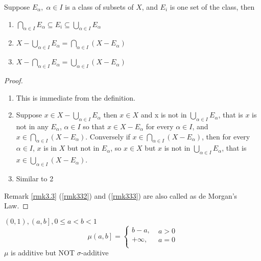 \begin{remark}
	Suppose ${E_\alpha },\;\alpha  \in I$ is a class of subsets of $ X $, and $ E_{i} $ is one set of the class, then
	\begin{enumerate}
		\item $\bigcap\limits_{\alpha  \in I} {{E_\alpha } \subseteq {E_i}}  \subseteq \bigcup\limits_{\alpha  \in I} {{E_\alpha }} $
		\item \label{rmk332}$ X - \bigcup\limits_{\alpha  \in I} {{E_\alpha }}  = \bigcap\limits_{\alpha  \in I} {\left( {X - {E_\alpha }} \right)} $
		\item \label{rmk333}$ X - \bigcap\limits_{\alpha  \in I} {{E_\alpha }}  = \bigcup\limits_{\alpha  \in I} {\left( {X - {E_\alpha }} \right)} $
	\end{enumerate}
	\label{rmk3.3}
\end{remark}

\begin{proof}
	\text{}
	\begin{enumerate}
		\item This is immediate from the definition.
		\item Suppose $ x \in  X - \bigcup\limits_{\alpha  \in I} {{E_\alpha }} $ then $ x \in X $  and x is not in $ \bigcup\limits_{\alpha  \in I} {{E_\alpha }} $, that is $ x $ is not in any $  E_{\alpha} $, $ \alpha \in I $ so that $ x \in X - E_{\alpha} $ for every $ \alpha \in I $, and  $ x \in \bigcap\limits_{\alpha  \in I} {\left( {X - {E_\alpha }} \right)}. $ Conversely if  $ x \in \bigcap\limits_{\alpha  \in I} {\left( {X - {E_\alpha }} \right)}$, then for every $ \alpha \in I $, $ x $ is in $ X $ but not in $ E_{\alpha} $, so $ x  \in X$ but $ x $  is not in $\bigcup\limits_{\alpha  \in I} {{E_\alpha }} $, that is $x \in \bigcup\limits_{\alpha  \in I} {\left( {X - {E_\alpha }} \right)} $.
		\item Similar to 2
	\end{enumerate}	
Remark \ref{rmk3.3} (\ref{rmk332}) and (\ref{rmk333}) are also called as de Morgan's Law.	
\end{proof}

\begin{example}
	$\left( {0,1} \right),\left( {a,b} \right],0 \leqslant a < b < 1$
	\begin{equation}
	\mu \left( {a,b} \right] = \left\{ {\begin{matrix}
		{b - a,}  \\ 
		{ + \infty ,}  \\ 
		
		\end{matrix} } \right.\;\begin{matrix}
	{a > 0}  \\ 
	{a = 0}  \\ 
	
	\end{matrix} 
	\label{eq3.16}
	\end{equation}
	$ \mu  $ is additive but NOT $ \sigma $-additive
\end{example}

